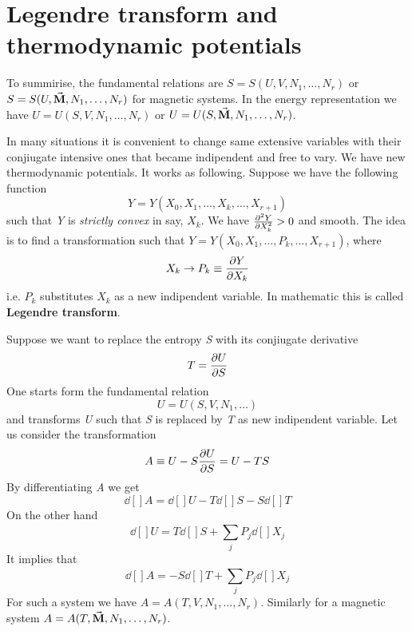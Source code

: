 \documentclass[../main/main.tex]{subfiles}
\begin{document}
\section{Legendre transform and thermodynamic potentials}
To summirise, the fundamental relations are \( S=S(U,V,N_1,\dots,N_r) \) or \( S=S(U,\va{M},N_1,\dots,N_r ) \) for magnetic systems.
In the energy representation we have \( U=U(S,V,N_1,\dots,N_r) \) or \( U=U(S,\va{M},N_1,\dots,N_r ) \).

In many situations it is convenient to change same extensive variables with their conjiugate intensive ones that became indipendent and free to vary. We have new thermodynamic potentials.
It works as following. Suppose we have the following function
\begin{equation*}
  Y=Y(X_0,X_1,\dots,X_k,\dots,X_{r+1})
\end{equation*}
such that \emph{Y} is \emph{strictly convex} in say, \( X_k \). We have \( \pdv[2]{Y}{X_k} > 0 \) and smooth.
The idea is to find a transformation such that \( Y=Y(X_0,X_1,\dots,P_k,\dots,X_{r+1}) \), where
\begin{equation}
  X_k \rightarrow P_k \equiv \pdv{Y}{X_k}
  \label{eq:}
\end{equation}
i.e. \( P_k \) substitutes \( X_k \) as a new indipendent variable.
In mathematic this is called \textbf{Legendre transform}.
\begin{example}
Suppose we want to replace the entropy \emph{S} with its conjiugate derivative
\begin{equation*}
  T = \pdv{U}{S}
\end{equation*}
One starts form the fundamental relation
\begin{equation*}
  U=U(S,V,N_1,\dots)
\end{equation*}
and transforms \emph{U} such that \emph{S} is replaced by \emph{T} as new indipendent variable. Let us consider the transformation
\begin{equation*}
  A \equiv U - S \pdv{U}{S} = U- T S
\end{equation*}
By differentiating \emph{A} we get
\begin{equation*}
  \dd[]{A} = \dd[]{U} - T \dd[]{S}  - S \dd[]{T}
\end{equation*}
On the other hand
\begin{equation*}
  \dd[]{U} = T \dd[]{S} + \sum_{j}^{} P_j \dd[]{X_j}
\end{equation*}
It implies that
\begin{equation*}
  \dd[]{A} = - S \dd[]{T} + \sum_{j}^{} P_j \dd[]{X_j}
\end{equation*}
For such a system we have \( A=A(T,V,N_1,\dots,N_r) \). Similarly for a magnetic system \( A=A(T,\va{M},N_1,\dots,N_r ) \).
\end{example}
\end{document}

